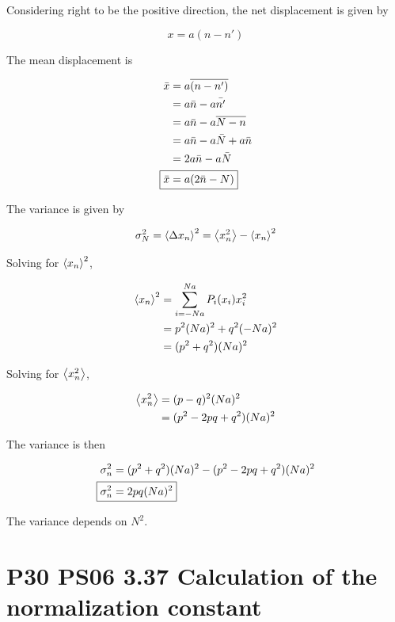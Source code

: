 \documentclass[9pt,a4paper,twocolumn]{article}
\begin{document}
Considering right to be the positive direction, the net displacement is given by

\begin{equation}
	\boxed{
		x = a(n - n') 
	}
\end{equation}

The mean displacement is

\begin{align}
	\bar{x} &= a\overline{(n - n')} \\
	&= a\bar{n} - a\bar{n'} \nonumber \\
	&= a\bar{n} - a\overline{N - n} \nonumber \\
	&= a\bar{n} - a\bar{N} + a\bar{n} \nonumber \\
	&= 2a\bar{n} - a\bar{N} \nonumber \\
	\Aboxed{
		\bar{x} &= a\qty(2\bar{n} - N) \nonumber
	}
\end{align}

The variance is given by

\begin{equation}
	\sigma_N^2 = \ev{\Delta x_n}^2 = \ev{x_n^2} - \ev{x_n}^2
\end{equation}

Solving for $\ev{x_n}^2$,

\begin{align}
	\ev{x_n}^2 &= \sum_{i=-Na}^{Na} P_i(x_i)x_i^2 \\
	&= p^2(Na)^2 + q^2(-Na)^2 \\
	&= (p^2 + q^2)(Na)^2
\end{align}

Solving for $\ev{x_n^2}$,

\begin{align}
	\ev{x_n^2} &= (p-q)^2(Na)^2 \\
	&= (p^2 - 2pq + q^2)(Na)^2
\end{align}

The variance is then

\begin{align}
	\sigma_n^2 &= (p^2 + q^2)(Na)^2 - (p^2 - 2pq + q^2)(Na)^2 \\
	\Aboxed{
		\sigma_n^2 &= 2pq(Na)^2
	}
\end{align}

The variance depends on $N^2$.

\section{P30 PS06 3.37 Calculation of the normalization constant}
\end{document}
